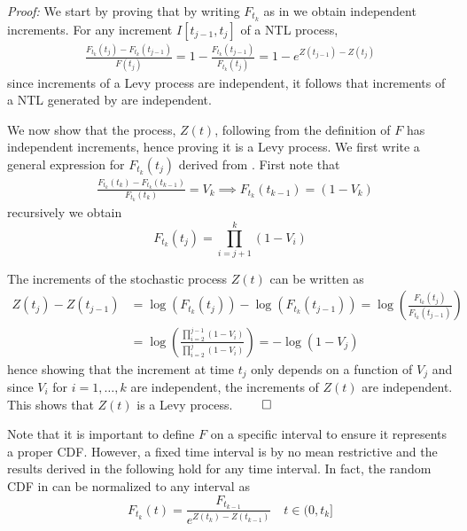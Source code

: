 \textit{Proof:} We start by proving that by writing $F_{t_k}$ as in  we obtain independent increments. For any increment $I[t_{j-1}, t_j]$ of a NTL process,
\begin{equation}\label{jump_equation}
\begin{split}
\frac{F_{t_k}(t_j) - F_{t_k}(t_{j-1})}{F(t_j)} = 1 - \frac{F_{t_k}(t_{j-1})}{F_{t_k}(t_j)} = 1 - e^{Z(t_{j-1}) -Z(t_j)}
\end{split}
\end{equation}
since increments of a Levy process are independent, it follows that increments of a NTL generated by  are independent. 

We now show that the process, $Z(t)$, following from the definition of $F$ has independent increments, hence proving it is a Levy process. We first write a general expression for $F_{t_k}(t_j)$ derived from . First note that
\begin{equation*}
\begin{split}
&\frac{F_{t_k}(t_k) - F_{t_k}(t_{k-1})}{F_{t_k}(t_{k})} = V_k \implies F_{t_k}(t_{k-1}) = (1-V_k)
\end{split}
\end{equation*} 
recursively we obtain
\begin{equation}\label{NTL_F}
F_{t_k}(t_j) = \prod_{i=j+1}^k (1 - V_i)
\end{equation}

The increments of the stochastic process $Z(t)$ can be written as 
\begin{equation*}
\begin{split}
Z(t_j) - Z(t_{j-1}) &= \log(F_{t_k}(t_j)) - \log(F_{t_k}(t_{j-1}))  = \log\left(\frac{F_{t_k}(t_{j})}{F_{t_k}(t_{j-1})}\right) \\ &= \log\left(\frac{\prod_{i=2}^{j-1} (1 - V_i)}{\prod_{i=2}^{j} (1 - V_i)}\right) = -\log(1 - V_j)
\end{split}
\end{equation*}
hence showing that the increment at time $t_j$ only depends on a function of $V_j$ and since $V_i$ for $i=1, \ldots, k$ are independent, the increments of $Z(t)$ are independent. This shows that $Z(t)$ is a Levy process. $\qed$

Note that it is important to define $F$ on a specific interval to ensure it represents a proper CDF. However, a fixed time interval is by no mean restrictive and the results derived in the following hold for any time interval. In fact, the random CDF in  can be normalized to any interval as
\begin{equation*}
F_{t_k}(t) = \frac{F_{t_{k-1}}}{e^{Z(t_k) - Z(t_{k-1})}} \quad t \in (0, t_k]
\end{equation*}

